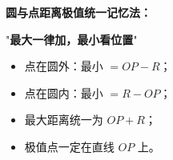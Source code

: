 \begin{summarybox}
\textbf{圆与点距离极值统一记忆法：}

\begin{center}
"\textbf{最大一律加，最小看位置}"
\end{center}

\begin{itemize}
  \item 点在圆外：最小 $=OP-R$；
  \item 点在圆内：最小 $=R-OP$；
  \item 最大距离统一为 $OP+R$；
  \item 极值点一定在直线 $OP$ 上。
\end{itemize}
\end{summarybox}
